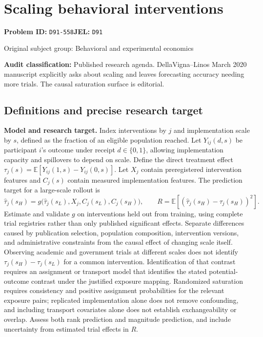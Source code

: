 \documentclass[11pt,a4paper]{article}
\begin{document}
\section*{Scaling behavioral interventions}
\textbf{Problem ID:} \texttt{D91-558}\quad \textbf{JEL:} \texttt{D91}\par
\label{problem:OP-0308}
{\sffamily\small\color{muted}Original subject group: Behavioral and experimental economics\par}
\label{definitions:problem:30007590}
\textbf{Audit classification:} Published research agenda. DellaVigna–Linos March 2020 manuscript explicitly asks about scaling and leaves forecasting accuracy needing more trials. The causal saturation surface is editorial.
\subsection*{Definitions and precise research target}
\textbf{Model and research target.} Index interventions by \(j\) and implementation scale by \(s\), defined as the fraction of an eligible population reached. Let \(Y_{ij}(d,s)\) be participant \(i\)'s outcome under receipt \(d\in\{0,1\}\), allowing implementation capacity and spillovers to depend on scale. Define the direct treatment effect \(\tau_j(s)=\mathbb E[Y_{ij}(1,s)-Y_{ij}(0,s)]\). Let \(X_j\) contain preregistered intervention features and \(C_j(s)\) contain measured implementation features. The prediction target for a large-scale rollout is
\[\widehat\tau_j(s_H)=g\bigl(\widehat\tau_j(s_L),X_j,C_j(s_L),C_j(s_H)\bigr),\qquad R=\mathbb E[(\widehat\tau_j(s_H)-\tau_j(s_H))^2].\]
Estimate and validate \(g\) on interventions held out from training, using complete trial registries rather than only published significant effects. Separate differences caused by publication selection, population composition, intervention versions, and administrative constraints from the causal effect of changing scale itself. Observing academic and government trials at different scales does not identify \(\tau_j(s_H)-\tau_j(s_L)\) for a common intervention. Identification of that contrast requires an assignment or transport model that identifies the stated potential-outcome contrast under the justified exposure mapping. Randomized saturation requires consistency and positive assignment probabilities for the relevant exposure pairs; replicated implementation alone does not remove confounding, and including transport covariates alone does not establish exchangeability or overlap. Assess both rank prediction and magnitude prediction, and include uncertainty from estimated trial effects in \(R\).
\end{document}
